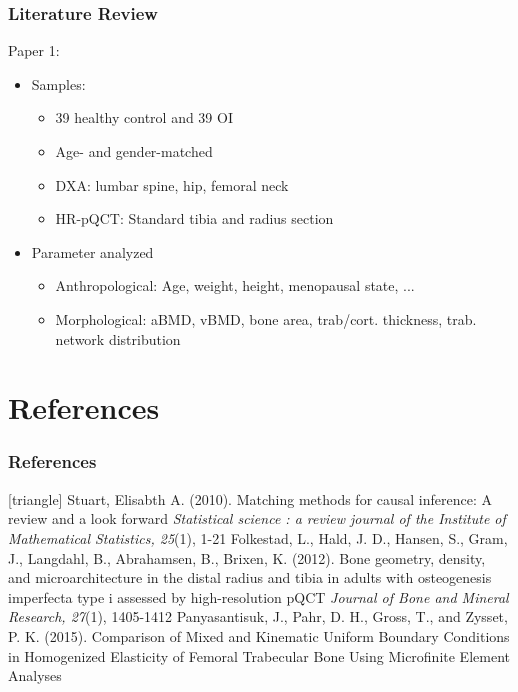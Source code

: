 \documentclass[xcolor=table]{beamer}
\begin{document}
\begin{frame}
	\frametitle{Literature Review}
	Paper 1: \cite{p2}
	\begin{itemize}[label=$\bullet$]
		\item Samples:
		\begin{itemize}[label=$-$]
			\item 39 healthy control and 39 OI
			\item Age- and gender-matched
			\item DXA: lumbar spine, hip, femoral neck
			\item HR-pQCT: Standard tibia and radius section
		\end{itemize}
		\item Parameter analyzed
		\begin{itemize}[label=$-$]
				\item Anthropological: Age, weight, height, menopausal state, ...
				\item Morphological: aBMD, vBMD, bone area, trab/cort. thickness, trab. network distribution
		\end{itemize}
	\end{itemize}
\end{frame}


\appendix

\section{References}
\begin{frame}
	\frametitle{References}
	\footnotesize{
		\begin{thebibliography}{99}
			[triangle]
			 Stuart, Elisabth A. (2010).
			\newblock Matching methods for causal inference: A review and a look forward
			\newblock \textit{Statistical science : a review journal of the Institute of Mathematical Statistics, 25}(1), 1-21
			\vspace{1mm}
			 Folkestad, L., Hald, J. D., Hansen, S., Gram, J., Langdahl, B., Abrahamsen, B., Brixen, K. (2012).
			\newblock Bone geometry, density, and microarchitecture in the distal radius and tibia in adults with osteogenesis imperfecta type i assessed by high-resolution pQCT
			\newblock \textit{Journal of Bone and Mineral Research, 27}(1), 1405-1412
			\vspace{1mm}
			 Panyasantisuk, J., Pahr, D. H., Gross, T., and Zysset, P. K. (2015).
			\newblock Comparison of Mixed and Kinematic Uniform Boundary Conditions in Homogenized Elasticity of Femoral Trabecular Bone Using Microfinite Element Analyses
		\end{thebibliography}
	}
\end{frame}

\end{document}
